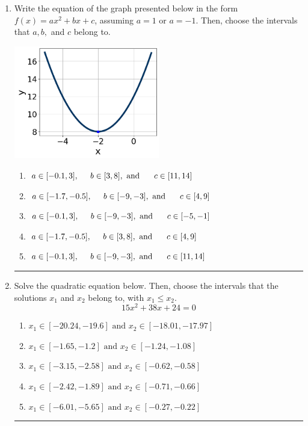 \documentclass[14pt]{extbook}
\newcommand{\litem}[1]{\item#1\hspace*{-1cm}\rule{\textwidth}{0.4pt}}
\begin{document}
\begin{enumerate}
{\begin{enumerate}[label=\Alph*.]
\end{enumerate} }
\litem{
Write the equation of the graph presented below in the form $f(x)=ax^2+bx+c$, assuming  $a=1$ or $a=-1$. Then, choose the intervals that $a, b,$ and $c$ belong to.
\begin{center}
    \includegraphics[width=0.5\textwidth]{../Figures/quadraticGraphToEquationC.png}
\end{center}
\begin{enumerate}[label=\Alph*.]
\item \( a \in [-0.1, 3], \hspace*{5mm} b \in [3, 8], \text{ and } \hspace*{5mm} c \in [11, 14] \)
\item \( a \in [-1.7, -0.5], \hspace*{5mm} b \in [-9, -3], \text{ and } \hspace*{5mm} c \in [4, 9] \)
\item \( a \in [-0.1, 3], \hspace*{5mm} b \in [-9, -3], \text{ and } \hspace*{5mm} c \in [-5, -1] \)
\item \( a \in [-1.7, -0.5], \hspace*{5mm} b \in [3, 8], \text{ and } \hspace*{5mm} c \in [4, 9] \)
\item \( a \in [-0.1, 3], \hspace*{5mm} b \in [-9, -3], \text{ and } \hspace*{5mm} c \in [11, 14] \)

\end{enumerate} }
\litem{
Solve the quadratic equation below. Then, choose the intervals that the solutions $x_1$ and $x_2$ belong to, with $x_1 \leq x_2$.\[ 15x^{2} +38 x + 24 = 0 \]\begin{enumerate}[label=\Alph*.]
\item \( x_1 \in [-20.24, -19.6] \text{ and } x_2 \in [-18.01, -17.97] \)
\item \( x_1 \in [-1.65, -1.2] \text{ and } x_2 \in [-1.24, -1.08] \)
\item \( x_1 \in [-3.15, -2.58] \text{ and } x_2 \in [-0.62, -0.58] \)
\item \( x_1 \in [-2.42, -1.89] \text{ and } x_2 \in [-0.71, -0.66] \)
\item \( x_1 \in [-6.01, -5.65] \text{ and } x_2 \in [-0.27, -0.22] \)


\end{enumerate}}
\end{enumerate}
\end{document}
